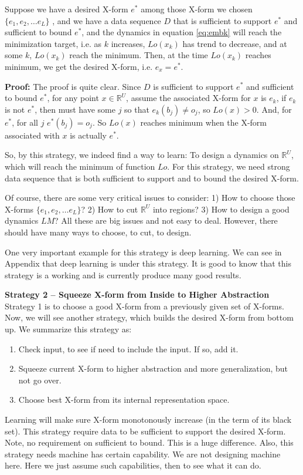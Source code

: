 \begin{theorem}
Suppose we have a desired X-form $e^*$ among those X-form we chosen $\{e_1, e_2, \ldots e_L\}$ , and we have a data sequence $D$ that is sufficient to support $e^*$ and sufficient to bound $e^*$, and the dynamics in equation \eqref{eq:embk} will reach the minimization target, i.e. as $k$ increases, $Lo(x_k)$ has trend to decrease, and at some $k$, $Lo(x_k)$ reach the minimum. Then, at the time $Lo(x_k)$ reaches minimum, we get the desired X-form, i.e. $e_x = e^*$.        
\end{theorem}
{\bf Proof:} The proof is quite clear. Since $D$ is sufficient to support $e^*$ and sufficient to bound $e^*$, for any point $x \in \mathbb{R}^U$, assume the associated X-form for $x$ is $e_k$, if $e_k$ is not $e^*$, then must have some $j$ so that  $e_k(b_j) \not= o_j$, so $Lo(x) > 0$. And, for $e^*$, for all $j$ $e^*(b_j) = o_j$. So $Lo(x)$ reaches minimum when the X-form associated with $x$ is actually $e^*$. 

So, by this strategy, we indeed find a way to learn: To design a dynamics on $\mathbb{R}^U$, which will reach the minimum of function $Lo$. For this strategy, we need strong data sequence that is both sufficient to support and to bound the desired X-form. 

Of course, there are some very critical issues to consider: 1) How to choose those X-forms $\{e_1, e_2, \ldots e_L\}$? 2) How to cut $\mathbb{R}^U$ into regions? 3) How to design a good dynamics $LM$? All these are big issues and not easy to deal. However, there should have many ways to choose, to cut, to design. 

One very important example for this strategy is deep learning. We can see in Appendix that deep learning is under this strategy. It is good to know that this strategy is a working and is currently produce many good results. 
\bigskip



{\bf Strategy 2 -- Squeeze X-form from Inside to Higher Abstraction}\\
Strategy 1 is to choose a good X-form from a previously given set of X-forms. Now, we will see another strategy, which builds the desired X-form from bottom up. We summarize this strategy as: 
\begin{enumerate} [topsep=0pt,itemsep=-1ex,partopsep=1ex,parsep=1ex]
\item Check input, to see if need to include the input. If so, add it. 
\item Squeeze current X-form to higher abstraction and more generalization, but not go over.
\item Choose best X-form from its internal representation space. 
\end{enumerate}
Learning will make sure X-form monotonously increase (in the term of its black set). This strategy require data to be sufficient to support the desired X-form. Note, no requirement on sufficient to bound. This is a huge difference. Also, this strategy needs machine has certain capability. We are not designing machine here. Here we just assume such capabilities, then to see what it can do. 


